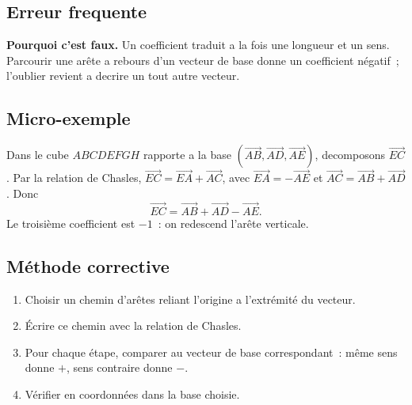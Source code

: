 

\subsection*{Erreur frequente}


\textbf{Pourquoi c'est faux.} Un coefficient traduit a la fois une longueur et
un sens. Parcourir une arête a rebours d'un vecteur de base donne un
coefficient négatif~; l'oublier revient a decrire un tout autre vecteur.

\subsection*{Micro-exemple}

Dans le cube $ABCDEFGH$ rapporte a la base
$(\vec{AB},\vec{AD},\vec{AE})$, decomposons $\vec{EC}$.
Par la relation de Chasles, $\vec{EC}=\vec{EA}+\vec{AC}$, avec
$\vec{EA}=-\vec{AE}$ et $\vec{AC}=\vec{AB}+\vec{AD}$. Donc
\[
  \vec{EC}=\vec{AB}+\vec{AD}-\vec{AE}.
\]
Le troisième coefficient est $-1$~: on redescend l'arête verticale.

\subsection*{Méthode corrective}

\begin{enumerate}
  \item Choisir un chemin d'arêtes reliant l'origine a l'extrémité du vecteur.
  \item Écrire ce chemin avec la relation de Chasles.
  \item Pour chaque étape, comparer au vecteur de base correspondant~: même
        sens donne $+$, sens contraire donne $-$.
  \item Vérifier en coordonnées dans la base choisie.
\end{enumerate}

